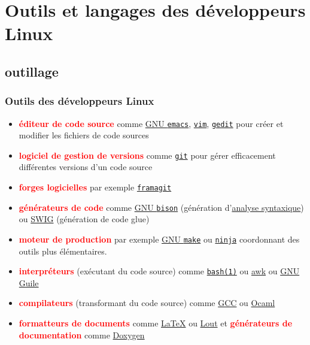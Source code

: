 \documentclass[xcolor=svgnames,final,smaller,a4]{beamer}
\begin{document}
\section{Outils et langages des développeurs Linux}

\subsection{outillage}

\begin{frame}
  \frametitle{Outils des développeurs Linux}

  \begin{relsize}{-1}
  \begin{itemize}

  \item  \textbf{\textcolor{red}{éditeur de code source}} comme \href{https://www.gnu.org/software/emacs/}{GNU \texttt{emacs}},
    \href{https://vim.org/}{\texttt{vim}}, \href{https://help.gnome.org/users/gedit/}{\texttt{gedit}} pour créer et modifier les fichiers de code sources


  \item  \textbf{\textcolor{red}{logiciel de gestion de versions}} comme \href{https://fr.wikipedia.org/wiki/Git}{\texttt{git}} pour gérer efficacement différentes versions d'un code source
\
\item  \textbf{\textcolor{red}{forges logicielles}} par exemple  \href{https://framagit.org/}{\texttt{framagit}}

  \item  \textbf{\textcolor{red}{générateurs de code}} comme
    \href{https://fr.wikipedia.org/wiki/GNU\_Bison}{GNU
      \texttt{bison}} (génération
    d'\href{https://fr.wikipedia.org/wiki/Analyse_syntaxique}{analyse
      syntaxique}) ou \href{https://fr.wikipedia.org/wiki/SWIG}{SWIG}
    (génération de code glue)
   
  \item  \textbf{\textcolor{red}{moteur de production}} par exemple \href{https://fr.wikipedia.org/wiki/Make}{GNU \texttt{make}} ou \href{https://ninja-build.org}{\texttt{ninja}} coordonnant des outils plus élémentaires.
  \item \textbf{\textcolor{red}{interpréteurs}} (exécutant du code
    source) comme
    \href{https://man7.org/linux/man-pages/man1/bash.1.html}{\texttt{bash(1)}}
    ou \href{https://fr.wikipedia.org/wiki/Awk}{awk} ou
    \href{https://fr.wikipedia.org/wiki/GNU_Guile}{GNU Guile}
  \item  \textbf{\textcolor{red}{compilateurs}} (transformant du code source) comme \href{http://gcc.gnu.org/}{GCC} ou \href{http://ocaml.org/}{Ocaml}
  \item \textbf{\textcolor{red}{formatteurs de documents}} comme
    \href{https://fr.wikipedia.org/wiki/LaTeX}{\LaTeX} ou
    \href{https://fr.wikipedia.org/wiki/Lout}{Lout} et  \textbf{\textcolor{red}{générateurs de documentation}}
    comme \href{https://fr.wikipedia.org/wiki/Doxygen}{Doxygen}



\end{itemize}
\end{relsize}
\end{frame}
\end{document}
